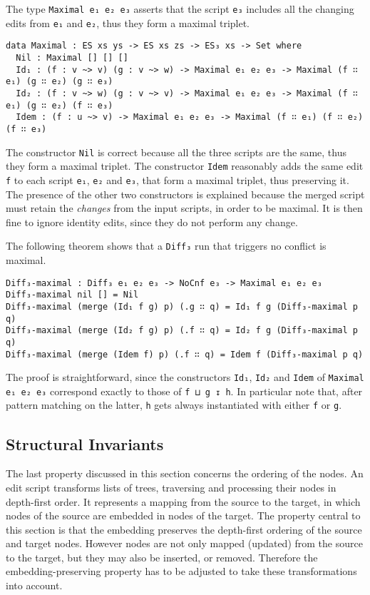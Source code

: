 \documentclass[../Thesis.tex]{subfiles}
\begin{document}
	The type \texttt{Maximal e₁ e₂ e₃} asserts that the script \texttt{e₃} includes
	all the changing edits from \texttt{e₁} and \texttt{e₂}, thus they
	form a maximal triplet.
	
\begin{verbatim}
data Maximal : ES xs ys -> ES xs zs -> ES₃ xs -> Set where
  Nil : Maximal [] [] []
  Id₁ : (f : v ~> v) (g : v ~> w) -> Maximal e₁ e₂ e₃ -> Maximal (f ∷ e₁) (g ∷ e₂) (g ∷ e₃)
  Id₂ : (f : v ~> w) (g : v ~> v) -> Maximal e₁ e₂ e₃ -> Maximal (f ∷ e₁) (g ∷ e₂) (f ∷ e₃)
  Idem : (f : u ~> v) -> Maximal e₁ e₂ e₃ -> Maximal (f ∷ e₁) (f ∷ e₂) (f ∷ e₃)
\end{verbatim}

	The constructor \texttt{Nil} is correct because all the three scripts
	are the same, thus they form a maximal triplet.
	The constructor \texttt{Idem} reasonably adds the same edit \texttt{f} 
	to each script \texttt{e₁}, \texttt{e₂} and \texttt{e₃}, that form a maximal 
	triplet, thus preserving it.
	The presence of the other two constructors is explained because 
	the merged script must retain the \emph{changes} from the 
	input scripts, in order to be maximal.
	It is then fine to ignore identity edits, since they do not perform any 
	change.
	
	The following theorem shows that a \texttt{Diff₃} run that triggers no
	conflict is maximal.
	
\begin{verbatim}
Diff₃-maximal : Diff₃ e₁ e₂ e₃ -> NoCnf e₃ -> Maximal e₁ e₂ e₃
Diff₃-maximal nil [] = Nil
Diff₃-maximal (merge (Id₁ f g) p) (.g ∷ q) = Id₁ f g (Diff₃-maximal p q)
Diff₃-maximal (merge (Id₂ f g) p) (.f ∷ q) = Id₂ f g (Diff₃-maximal p q)
Diff₃-maximal (merge (Idem f) p) (.f ∷ q) = Idem f (Diff₃-maximal p q)
\end{verbatim}
	
	The proof is straightforward, since the constructors \texttt{Id₁}, \texttt{Id₂} 
	and \texttt{Idem} of \texttt{Maximal e₁ e₂ e₃} correspond exactly to those
	of \texttt{f ⊔ g ↧ h}.
	In particular note that, after pattern matching on the latter, \texttt{h} gets
	always instantiated with either \texttt{f} or \texttt{g}.
		
	\subsection{Structural Invariants}
	\label{subsec:Embedding}
	The last property discussed in this section concerns the ordering of 
	the nodes. An edit script transforms lists of trees, traversing and processing 
	their nodes in depth-first order.
	It represents a mapping from the source to the target, in which 
	nodes of the source are embedded in nodes of the target.
	The property central to this section is that the 
	embedding preserves the depth-first ordering of the 
	source and target nodes.
	However nodes are not only mapped (updated) from the source to the 
	target, but they may also be inserted, or removed. 
	Therefore the embedding-preserving property has to be adjusted to
	take these transformations into account.
	
\end{document}

